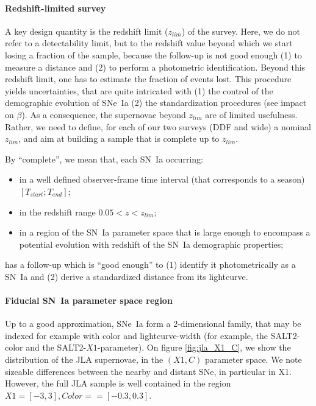 \documentclass[\docopts]{\docclass}
\begin{document}
\paragraph{Redshift-limited survey} A key design quantity is the
redshift limit ($z_{lim}$) of the survey. Here, we do not refer to a
detectability limit, but to the redshift value beyond which we start
losing a fraction of the sample, because the follow-up is not good
enough (1) to measure a distance and (2) to perform a photometric
identification.  Beyond this redshift limit, one has to estimate the
fraction of events lost. This procedure yields uncertainties, that are
quite intricated with (1) the control of the demographic evolution of
SNe~Ia (2) the standardization procedures (see impact on $\beta$).  As
a consequence, the supernovae beyond $z_{lim}$ are of limited
usefulness.  Rather, we need to define, for each of our two surveys
(DDF and wide) a nominal $z_{lim}$, and aim at building a sample that
is complete up to $z_{lim}$. 

By ``complete'', we mean that, each SN~Ia occurring:
\begin{itemize}
\item in a well defined observer-frame time interval (that corresponds
  to a season) $[T_{start}; T_{end}]$;
\item in the redshift range $0.05 < z < z_{lim}$;
\item in a region of the SN~Ia parameter space that is large enough to
  encompass a potential evolution with redshift of the SN~Ia
  demographic properties;
\end{itemize}
has a follow-up which is ``good enough'' to (1) identify it
photometrically as a SN~Ia and (2) derive a standardized distance from
its lightcurve.

\paragraph{Fiducial SN~Ia parameter space region} Up to a good
approximation, SNe~Ia form a 2-dimensional family, that may be indexed
for example with color and lightcurve-width (for example, the
SALT2-color and the SALT2-$X1$-parameter).  On figure
\ref{fig:jla_X1_C}, we show the distribution of the JLA supernovae, in
the $(X1,C)$ parameter space. We note sizeable differences between the
nearby and distant SNe, in particular in X1.  However, the full JLA
sample is well contained in the region $X1 = [-3,3], Color= = [-0.3,
0.3]$. 
\end{document}
